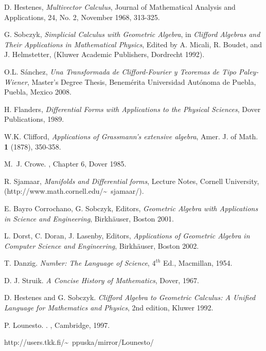 \documentclass[12]{article}
\begin{document}
\begin{thebibliography}{}

 D. Hestenes, {\it Multivector Calculus}, 
Journal of Mathematical Analysis and Applications, 24, No. 2, November 1968, 313-325.

 G. Sobczyk, {\it Simplicial Calculus with Geometric Algebra}, 
in {\em Clifford Algebras and Their Applications in Mathematical Physics}, Edited by A. Micali,
 R. Boudet, and J. Helmstetter, (Kluwer Academic Publishers, Dordrecht 1992).

 O.L. S\'anchez, {\it Una Transformada de Clifford-Fourier y Teoremas de Tipo Paley-Wiener},
Master's Degree Thesis, Benem\'erita Universidad Aut\'onoma de Puebla, Puebla, Mexico 2008.
 
  H. Flanders, {\it Differential Forms with Applications to the Physical Sciences}, 
Dover Publications, 1989.  

 
 W.K. Clifford, {\it Applications of Grassmann's extensive algebra}, Amer. J. of Math. {\bf 1} 
(1878), 350-358.

 M.~J. Crowe. , Chapter 6, Dover 1985.

 R. Sjamaar, {\it Manifolds and Differential forms}, Lecture Notes, Cornell University,
(http://www.math.cornell.edu/\~~sjamaar/).

 E. Bayro Corrochano, G. Sobczyk, Editors,
 {\it Geometric Algebra with Applications in Science and Engineering},
Birkh\"auser, Boston 2001.

 L. Dorst, C. Doran, J. Lasenby, Editors, {\it Applications of Geometric Algebra in Computer Science
and Engineering}, Birkh\"auser, Boston 2002.

 T. Danzig. {\it Number: The Language of Science}, $4^{th}$
Ed., Macmillan, 1954.

 D. J. Struik. {\it A Concise History of Mathematics},
Dover, 1967.

 D. Hestenes and G. Sobczyk. {\it Clifford Algebra to
Geometric Calculus: A Unified Language for Mathematics and Physics},
2nd edition, Kluwer 1992.

P. Lounesto.
.
, Cambridge, 1997.

  http://users.tkk.fi/\~~ppuska/mirror/Lounesto/  


\end{thebibliography}
\end{document}
